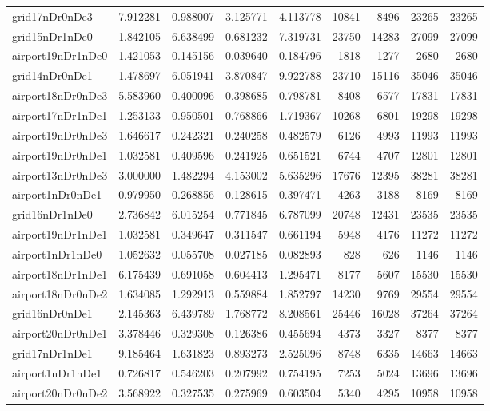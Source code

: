 \begin{longtable}{|l|r|r|r|r|r|r|r|r|}
grid17nDr0nDe3 & 7.912281 & 0.988007 & 3.125771 & 4.113778 & 10841 & 8496 & 23265 & 23265 \\
grid15nDr1nDe0 & 1.842105 & 6.638499 & 0.681232 & 7.319731 & 23750 & 14283 & 27099 & 27099 \\
airport19nDr1nDe0 & 1.421053 & 0.145156 & 0.039640 & 0.184796 & 1818 & 1277 & 2680 & 2680 \\
grid14nDr0nDe1 & 1.478697 & 6.051941 & 3.870847 & 9.922788 & 23710 & 15116 & 35046 & 35046 \\
airport18nDr0nDe3 & 5.583960 & 0.400096 & 0.398685 & 0.798781 & 8408 & 6577 & 17831 & 17831 \\
airport17nDr1nDe1 & 1.253133 & 0.950501 & 0.768866 & 1.719367 & 10268 & 6801 & 19298 & 19298 \\
airport19nDr0nDe3 & 1.646617 & 0.242321 & 0.240258 & 0.482579 & 6126 & 4993 & 11993 & 11993 \\
airport19nDr0nDe1 & 1.032581 & 0.409596 & 0.241925 & 0.651521 & 6744 & 4707 & 12801 & 12801 \\
airport13nDr0nDe3 & 3.000000 & 1.482294 & 4.153002 & 5.635296 & 17676 & 12395 & 38281 & 38281 \\
airport1nDr0nDe1 & 0.979950 & 0.268856 & 0.128615 & 0.397471 & 4263 & 3188 & 8169 & 8169 \\
grid16nDr1nDe0 & 2.736842 & 6.015254 & 0.771845 & 6.787099 & 20748 & 12431 & 23535 & 23535 \\
airport19nDr1nDe1 & 1.032581 & 0.349647 & 0.311547 & 0.661194 & 5948 & 4176 & 11272 & 11272 \\
airport1nDr1nDe0 & 1.052632 & 0.055708 & 0.027185 & 0.082893 & 828 & 626 & 1146 & 1146 \\
airport18nDr1nDe1 & 6.175439 & 0.691058 & 0.604413 & 1.295471 & 8177 & 5607 & 15530 & 15530 \\
airport18nDr0nDe2 & 1.634085 & 1.292913 & 0.559884 & 1.852797 & 14230 & 9769 & 29554 & 29554 \\
grid16nDr0nDe1 & 2.145363 & 6.439789 & 1.768772 & 8.208561 & 25446 & 16028 & 37264 & 37264 \\
airport20nDr0nDe1 & 3.378446 & 0.329308 & 0.126386 & 0.455694 & 4373 & 3327 & 8377 & 8377 \\
grid17nDr1nDe1 & 9.185464 & 1.631823 & 0.893273 & 2.525096 & 8748 & 6335 & 14663 & 14663 \\
airport1nDr1nDe1 & 0.726817 & 0.546203 & 0.207992 & 0.754195 & 7253 & 5024 & 13696 & 13696 \\
airport20nDr0nDe2 & 3.568922 & 0.327535 & 0.275969 & 0.603504 & 5340 & 4295 & 10958 & 10958 \\

\end{longtable}
